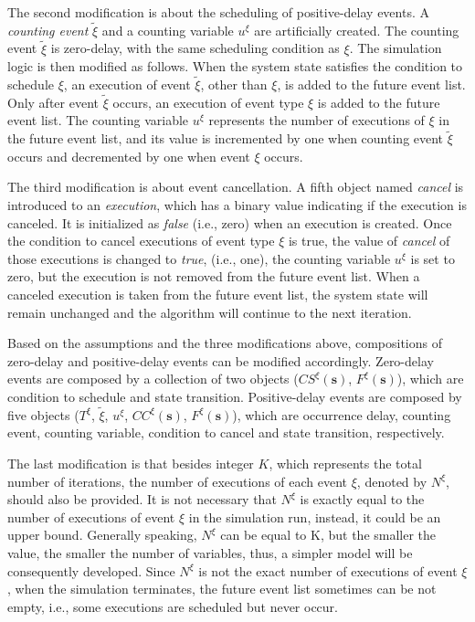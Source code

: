 \documentclass[suppldata]{interact}
\theoremstyle{plain}
\theoremstyle{definition}
\theoremstyle{remark}
\begin{document}
The second modification is about the scheduling of positive-delay events. A \textit{counting event} ${\tilde{\xi}}$ and a counting variable $u^{\xi}$ are artificially created. The counting event ${\tilde{\xi}}$ is zero-delay, with the same scheduling condition as ${\xi}$. The simulation logic is then modified as follows. When the system state satisfies the condition to schedule $\xi$, an execution of event $\tilde{\xi}$, other than $\xi$, is added to the future event list. Only after event ${\tilde{\xi}}$ occurs, an execution of event type ${\xi}$ is added to the future event list. The counting variable $u^{\xi}$ represents the number of executions of ${\xi}$ in the future event list, and its value is incremented by one when counting event ${\tilde{\xi}}$ occurs and decremented by one when event ${\xi}$ occurs. 

The third modification is about event cancellation. A fifth object named \textit{cancel} is introduced to an \textit{execution}, which has a binary value indicating if the execution is canceled. It is initialized as \textit{false} (i.e., zero) when an execution is created. Once the condition to cancel executions of event type $\xi$ is true, the value of \textit{cancel} of those executions is changed to \textit{true}, (i.e., one), the counting variable $u^{\xi}$ is set to zero, but the execution is not removed from the future event list. When a canceled execution is taken from the future event list, the system state will remain unchanged and the algorithm will continue to the next iteration. 

Based on the assumptions and the three modifications above, compositions of zero-delay and positive-delay events can be modified accordingly. Zero-delay events are composed by a collection of two objects ($CS^{\xi}(\mathbf{s})$, $F^{\xi}(\mathbf{s})$), which are condition to schedule and state transition. Positive-delay events are composed by five objects ($T^{\xi}$, $\tilde{\xi}$, $u^{\xi}$, $CC^{\xi}(\mathbf{s})$, $F^{\xi}(\mathbf{s})$), which are occurrence delay, counting event, counting variable, condition to cancel and state transition, respectively.

The last modification is that besides integer $K$, which represents the total number of iterations, the number of executions of each event $\xi$, denoted by $N^{\xi}$, should also be provided. It is not necessary that $N^{\xi}$ is exactly equal to the number of executions of event $\xi$ in the simulation run, instead, it could be an upper bound. Generally speaking, $N^{\xi}$ can be equal to K, but the smaller the value, the smaller the number of variables, thus, a simpler model will be consequently developed. Since $N^{\xi}$ is not the exact number of executions of event $\xi$, when the simulation terminates, the future event list sometimes can be not empty, i.e., some executions are scheduled but never occur.
\end{document}
